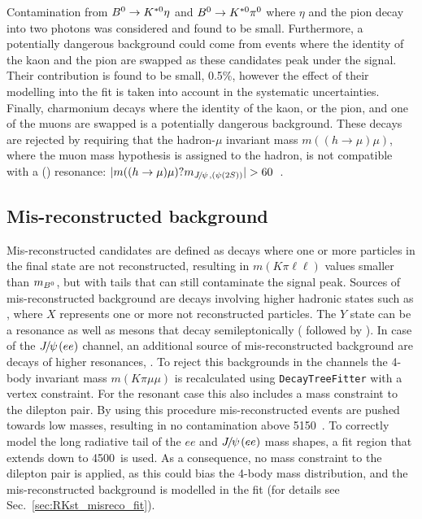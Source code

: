 
Contamination from $\Bz \to\Kstarz\eta$ and $\Bz \to\Kstarz\pi^0$ where $\eta$ and the pion decay into
two photons was considered and found to be small.
Furthermore, a potentially dangerous background could come from events where the
identity of the kaon and the pion are swapped as these candidates peak under the signal.
Their contribution is found to be small, 0.5\%, however the effect of their modelling into the fit
is taken into account in the systematic uncertainties.
Finally, charmonium decays where the identity of the kaon, or the pion, and one of the muons are swapped
is a potentially dangerous background. These decays are rejected by requiring that the hadron-$\mu$ invariant
mass $m((h \to \mu)\mu)$, where the muon mass hypothesis is assigned to the hadron, is not compatible with
a \jpsi (\psitwos) resonance: $|m((h\to \mu)\mu)?m_{\jpsi, (\psitwos)} | > 60$~\mevcc.

\subsection{Mis-reconstructed background}
\label{sec:RKst_peaking_Dchains}

Mis-reconstructed candidates are defined as decays where one or more particles in the final state are not reconstructed,
resulting in $m(K\pi\ell\ell)$ values smaller than $m_{{{B}^0}}$, but with tails that can still contaminate the signal peak.
Sources of mis-reconstructed background are decays involving higher hadronic states such as 
, where $X$ represents one or more not reconstructed particles. 
The $Y$ state can be a \Kstar resonance as well as \D mesons that decay semileptonically (\eg \decay{\Bz}{\Dm\ell^+ \bar{\nu_\ell}}
followed by \decay{\Dm}{\Kstarz \ell^- \nu_\ell}). In case of the $\jpsi(ee)$ channel, an additional source of mis-reconstructed 
background are decays of higher \ccbar resonances, .
%
To reject this backgrounds in the \mm channels the 4-body invariant mass $m(K\pi\mu\mu)$ is recalculated using 
\verb!DecayTreeFitter! with a vertex constraint. For the resonant case this also includes a \jpsi mass constraint to the dilepton pair. 
By using this procedure mis-reconstructed events are pushed towards low masses, resulting in no contamination above 5150~\mevcc.
%
To correctly model the long radiative tail of the $ee$ and $\jpsi(ee)$ mass shapes, a fit region that extends down to 4500~\mevcc is used.
As a consequence, no mass constraint to the dilepton pair is applied, as this could bias the 4-body mass distribution, and the
mis-reconstructed background is modelled in the fit (for details see Sec.~\ref{sec:RKst_misreco_fit}).


